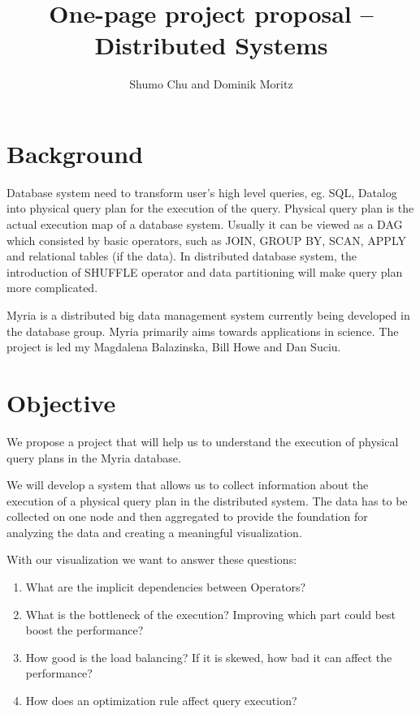 \documentclass[11pt]{article}
\begin{document}

\title{One-page project proposal \--- Distributed Systems}
\author{Shumo Chu and Dominik Moritz}
\date{}

\maketitle

\section*{Background}

Database system need to transform user's high level queries, eg. SQL, Datalog into physical query plan for the execution of the query. Physical query plan is the actual execution map of a database system. Usually it can be viewed as a DAG which consisted by basic operators, such as JOIN, GROUP BY, SCAN, APPLY and relational tables (if the data). In distributed database system, the introduction of SHUFFLE operator and data partitioning will make query plan more complicated.

Myria is a distributed big data management system currently being developed in the database group. Myria primarily aims towards applications in science. The project is led my Magdalena Balazinska, Bill Howe and Dan Suciu.

\section*{Objective}

We propose a project that will help us to understand the execution of physical query plans in the Myria database.

We will develop a system that allows us to collect information about the execution of a physical query plan in the distributed system. The data has to be collected on one node and then aggregated to provide the foundation for analyzing the data and creating a meaningful visualization. 

With our visualization we want to answer these questions:

\begin{enumerate}
	\item What are the implicit dependencies between Operators?
	\item What is the bottleneck of the execution? Improving which part could best boost the performance?
	\item How good is the load balancing? If it is skewed, how bad it can affect the performance?
	\item How does an optimization rule affect query execution?
\end{enumerate}
\end{document}
